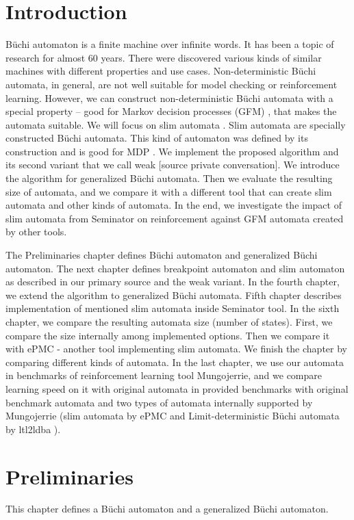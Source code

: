 \documentclass[
	digital,
nolof, nolot
]{fithesis3}
\begin{document}
	\chapter{Introduction}
	Büchi automaton is a finite machine over infinite words. It has been a topic of research for almost 60 years.
	There were discovered various kinds of similar machines with different properties and use cases.
	Non-deterministic Büchi automata, in general, are not well suitable for model checking or reinforcement learning. However, we can construct non-deterministic Büchi automata with a special property -- good for Markov decision processes (GFM)  \cite{hlavni}, that makes the automata suitable. We will focus on slim automata \cite{hlavni}.
	Slim automata are specially constructed Büchi automata. This kind of automaton was defined by its construction and is good for MDP \cite{hlavni}. We implement the proposed algorithm and its second variant that we call weak [source private conversation]. We introduce the algorithm for generalized Büchi automata. Then we evaluate the resulting size of automata, and we compare it with a different tool that can create slim automata and other kinds of automata. In the end, we investigate the impact of slim automata from Seminator on reinforcement against GFM automata created by other tools.
	
	The Preliminaries chapter defines Büchi automaton and generalized Büchi automaton.
	The next chapter defines breakpoint automaton and slim automaton as described in our primary source \cite{hlavni} and the weak variant.
	In the fourth chapter, we extend the algorithm to generalized Büchi automata.
	Fifth chapter describes implementation of mentioned slim automata inside Seminator \cite{Klokočka2017thesis}\cite{seminator}\cite{seminator2} tool.
	In the sixth chapter, we compare the resulting automata size (number of states). First, we compare the size internally among implemented options. Then we compare it with ePMC \cite{epmc} - another tool implementing slim automata. We finish the chapter by comparing different kinds of automata.
	In the last chapter, we use our automata in benchmarks of reinforcement learning tool Mungojerrie\cite{mungojerrie}, and we compare learning speed on it with original automata in provided benchmarks with original benchmark automata and two types of automata internally supported by Mungojerrie (slim automata by ePMC and Limit-deterministic Büchi automata by ltl2ldba \cite{ltl2ldba}).
	
	

	\chapter{Preliminaries}
		This chapter defines a Büchi automaton and a generalized Büchi automaton. 
		
\end{document}
